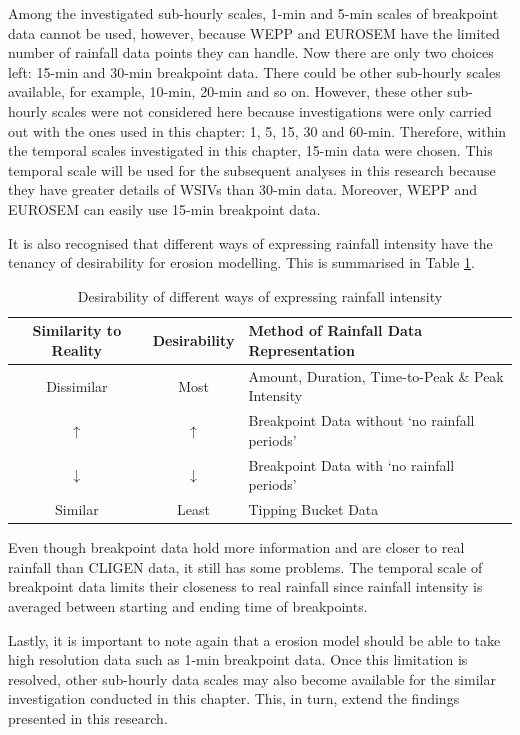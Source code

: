 Among the investigated sub-hourly scales, 1-min and 5-min scales of breakpoint
data cannot be used, however, because WEPP and EUROSEM have the limited number
of rainfall data points they can handle. Now there are only two choices left:
15-min and 30-min breakpoint data.
There could be other sub-hourly scales available, for example, 10-min, 20-min
and so on. However, these other sub-hourly scales were not considered here
because investigations were only carried out with the ones used in this chapter:
1, 5, 15, 30 and 60-min. Therefore, within the temporal scales investigated in
this chapter, 15-min data were chosen. This temporal scale will be used for the
subsequent analyses in this research because they have greater details of WSIVs
than 30-min data. Moreover, WEPP and EUROSEM can easily use 15-min breakpoint
data.

It is also recognised that different ways of expressing rainfall intensity have
the tenancy of desirability for erosion modelling. This is summarised in Table
\ref{tab:DesirabilityOfDifferentWaysOfExpressingRainfallIntensity}.

\begin{table}[htbp]
  \small
  \centering
      \caption{Desirability of different ways of expressing rainfall intensity}
  \label{tab:DesirabilityOfDifferentWaysOfExpressingRainfallIntensity}
    \begin{tabular}{ccl}
    \toprule
    Similarity to Reality & Desirability & Method of Rainfall Data
Representation\\
    \midrule
    Dissimilar & Most & Amount, Duration, Time-to-Peak \& Peak Intensity\\
    $\uparrow$ & $\uparrow$ &  Breakpoint Data without `no rainfall periods'\\
    $\downarrow$ & $\downarrow$ &  Breakpoint Data with `no rainfall periods'\\
    Similar & Least & Tipping Bucket Data\\
    \bottomrule
    \end{tabular}
\end{table}

Even though breakpoint data hold more information and are closer to real
rainfall than CLIGEN data, it still has some problems. The temporal scale of
breakpoint data limits their closeness to real rainfall since rainfall intensity
is averaged between starting and ending time of breakpoints.

Lastly, it is important to note again that a erosion model should be able
to take high resolution data such as 1-min breakpoint data. Once this
limitation is resolved, other sub-hourly data scales may also become available
for the similar investigation conducted in this chapter. This, in turn, extend
the findings presented in this research.

